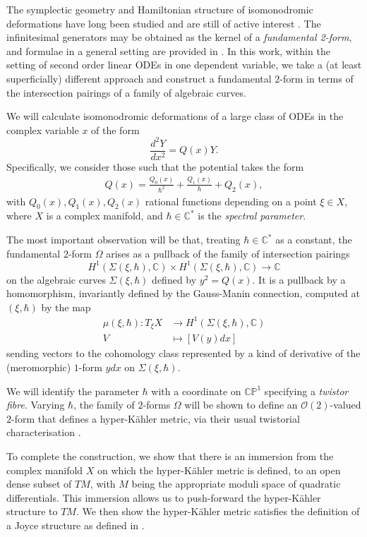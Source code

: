 \documentclass[a4paper,12pt,reqno]{amsart}
\numberwithin{equation}{section}
\numberwithin{counter2}{section}
\begin{document}
\par
The symplectic geometry and Hamiltonian structure of isomonodromic deformations have long been studied \cite{Bo} and are still of active interest \cite{BK}.   The infinitesimal generators may be obtained as the kernel of a \textit{fundamental 2-form},  and formulae in a general setting are provided in \cite{Y}.  In this work,  within the setting of second order linear ODEs in one dependent variable,  we take a (at least superficially) different approach and construct a fundamental $2$-form in terms of the intersection pairings of a family of algebraic curves.  \par 
We will calculate isomonodromic deformations of a large class of ODEs in the complex variable $x$ of the form
\begin{equation} 
\frac{d^2 Y}{dx^2} = Q(x)Y.  \label{schro}
\end{equation}
Specifically,  we consider those such that the potential takes the form
\begin{align}
Q(x) = \frac{Q_0(x)}{\hbar^2} + \frac{Q_1(x)}{\hbar} + Q_2(x),  
\end{align}
with $Q_0(x),Q_1(x),Q_2(x)$ rational functions depending on a point $\xi \in X$,  where $X$ is a complex manifold,  and $\hbar \in \mathbb{C}^*$ is the \textit{spectral parameter}.  \par  The most important observation will be that, treating $\hbar \in \mathbb{C}^*$ as a constant,  the fundamental $2$-form $\Omega$ arises as a pullback of the family of intersection pairings 
$$
H^1(\Sigma(\xi,\hbar),\mathbb{C}) \times H^1(\Sigma(\xi,\hbar),\mathbb{C}) \to \mathbb{C}
$$
on the algebraic curves $\Sigma(\xi,\hbar)$ defined by $y^2 = Q(x)$.  It is a pullback by a homomorphism,  invariantly defined by the Gauss-Manin connection,  computed at $(\xi,\hbar)$ by the map 
 \begin{align}
 \mu(\xi,\hbar) : T_{\xi}X &\to H^1(\Sigma(\xi,\hbar),\mathbb{C}) \\ 
V &\mapsto [V(y) dx]  \nonumber 
\end{align}
sending vectors to the cohomology class represented by a kind of derivative of the (meromorphic) $1$-form $y dx$ on $\Sigma(\xi,\hbar)$.  \par 
We will identify the parameter $\hbar$ with a coordinate on $\mathbb{CP}^1$ specifying a \textit{twistor fibre}.  Varying $\hbar$,  the family of $2$-forms $\Omega$ will be shown to define an $\mathcal{O}(2)$-valued $2$-form that defines a hyper-K\"ahler metric,  via their usual twistorial characterisation \cite{HKLR} \cite{BE}.  \par
To complete the construction,  we show that there is an immersion from the complex manifold $X$ on which the hyper-K\"ahler metric is defined,  to an open dense subset of $TM$,  with $M$ being the appropriate moduli space of quadratic differentials.  This immersion allows us to push-forward the hyper-K\"ahler structure to $TM$.  We then show the hyper-K\"ahler metric satisfies the definition of a Joyce structure as defined in \cite{BS}.  
\end{document}

